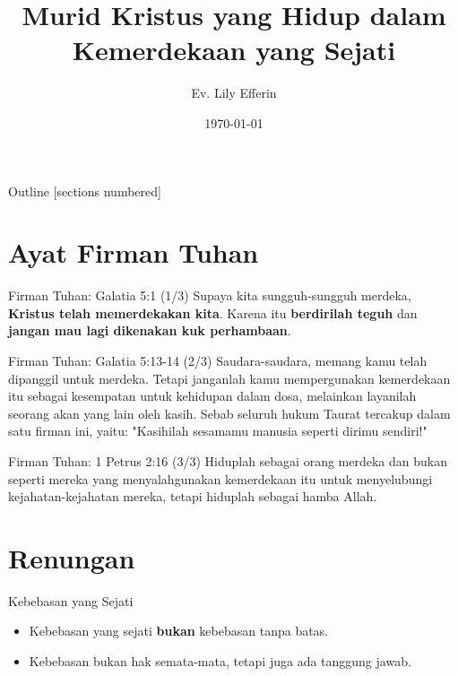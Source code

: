 \documentclass[10pt,svgnames]{beamer} %
\title{Murid Kristus yang Hidup dalam Kemerdekaan yang Sejati}
\author[Name]{Ev. Lily Efferin} %
\date{\today} %
\begin{document}
{
\maketitle
}%


\begin{frame}{Outline}
  [sections numbered] %
  \tableofcontents[hideallsubsections] %
\end{frame}

\section{Ayat Firman Tuhan}
\begin{frame}{Firman Tuhan: Galatia 5:1 (1/3)}
Supaya kita sungguh-sungguh merdeka, \textbf{Kristus telah memerdekakan kita}. Karena itu \textbf{berdirilah teguh} dan \textbf{jangan mau lagi dikenakan kuk perhambaan}.	
\end{frame}

\begin{frame}{Firman Tuhan: Galatia 5:13-14 (2/3)}
Saudara-saudara, memang kamu telah dipanggil untuk merdeka. Tetapi janganlah kamu mempergunakan kemerdekaan itu sebagai kesempatan untuk kehidupan dalam dosa, melainkan layanilah seorang akan yang lain oleh kasih. Sebab seluruh hukum Taurat tercakup dalam satu firman ini, yaitu: "Kasihilah sesamamu manusia seperti dirimu sendiri!"
\end{frame}

\begin{frame}{Firman Tuhan: 1 Petrus 2:16 (3/3)}
	Hiduplah sebagai orang merdeka dan bukan seperti mereka yang menyalahgunakan kemerdekaan itu untuk menyelubungi kejahatan-kejahatan mereka, tetapi hiduplah sebagai hamba Allah.	
\end{frame}

\section{Renungan}
\begin{frame}{Kebebasan yang Sejati}
	\begin{itemize}
		\item Kebebasan yang sejati \textbf{bukan} kebebasan tanpa batas.
		\item Kebebasan bukan hak semata-mata, tetapi juga ada tanggung jawab.
	\end{itemize}	
\end{frame}
\end{document}

